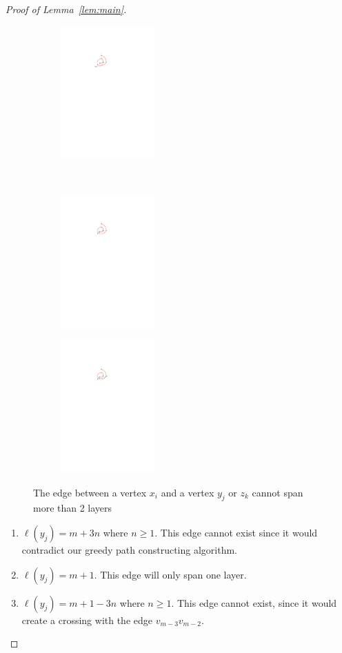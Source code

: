 \documentclass{jgaa-art}
\newcommand{\figlabel}[1]{\label{fig:#1}}
\newcommand{\lemref}[1]{Lemma~\ref{lem:#1}}
\begin{document}
\begin{proof}[Proof of \lemref{main}]
\begin{figure}
\begin{center}
    \begin{subfigure}[t]{0.4\hsize}\includegraphics[width=36mm]{figs/2layermaximum-5} \caption{}\end{subfigure}
    \\[2ex]
    \begin{subfigure}[t]{0.4\hsize}\includegraphics[width=36mm]{figs/2layermaximum-6} \caption{}\end{subfigure}
    \begin{subfigure}[t]{0.4\hsize}\includegraphics[width=36mm]{figs/2layermaximum-7} \caption{}\end{subfigure}
    \caption{The edge between a vertex $x_i$ and a vertex $y_j$ or $z_k$ cannot span more than 2 layers}
   \figlabel{2layermaximum}
 \end{center}
    \end{figure}

  \begin{enumerate}
  	\item$\ell(y_j) =  m+3n$ where $n \geq 1$. This edge cannot exist since it would contradict our greedy path constructing algorithm.
  	\item$\ell(y_j) =  m+1$. This edge will only span one layer.
  	\item $\ell(y_j) = m+1-3n$ where $n \geq 1$. This edge cannot exist, since it would create a crossing with the edge $v_{m-3}v_{m-2}$.
  \end{enumerate}


\end{proof}
\end{document}
